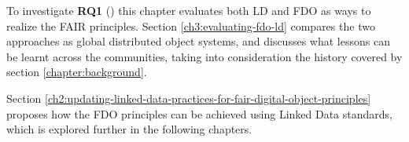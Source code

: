 
To investigate \textbf{RQ1} () this chapter evaluates both 
\acrlong{LD}
and 
\acrfull{FDO}
as ways to realize the FAIR principles. Section \ref{ch3:evaluating-fdo-ld} compares the two approaches as global distributed object systems, and discusses what lessons can be learnt across the communities, taking into consideration the history covered by section \ref{chapter:background}.

Section \ref{ch2:updating-linked-data-practices-for-fair-digital-object-principles} proposes how the FDO principles can be achieved using Linked Data standards, which is explored further in the following chapters.
